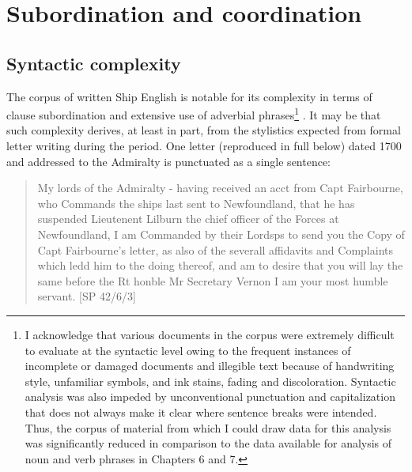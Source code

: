 \section{\textbf{Subordination} \textbf{and} \textbf{coordination}}%

\subsection{\textbf{Syntactic} \textbf{complexity}}%

  The corpus of written Ship English is notable for its complexity in terms of clause subordination and extensive use of adverbial phrases\footnote{I acknowledge that various documents in the corpus were extremely difficult to evaluate at the syntactic level owing to the frequent instances of incomplete or damaged documents and illegible text because of handwriting style, unfamiliar symbols, and ink stains, fading and discoloration. Syntactic analysis was also impeded by unconventional punctuation and capitalization that does not always make it clear where sentence breaks were intended. Thus, the corpus of material from which I could draw data for this analysis was significantly reduced in comparison to the data available for analysis of noun and verb phrases in Chapters 6 and 7.} . It may be that such complexity derives, at least in part, from the stylistics expected from formal letter writing during the period. One letter (reproduced in full below) dated 1700 and addressed to the Admiralty is punctuated as a single sentence: 

\begin{quotation}
My lords of the Admiralty - having received an acct from Capt Fairbourne, who Commands the ships last sent to Newfoundland, that he has suspended Lieutenent Lilburn the chief officer of the Forces at Newfoundland, I am Commanded by their Lordsps to send you the Copy of Capt Fairbourne’s letter, as also of the severall affidavits and Complaints which ledd him to the doing thereof, and am to desire that you will lay the same before the Rt honble Mr Secretary Vernon I am your most humble servant. [SP 42/6/3] \end{quotation}

